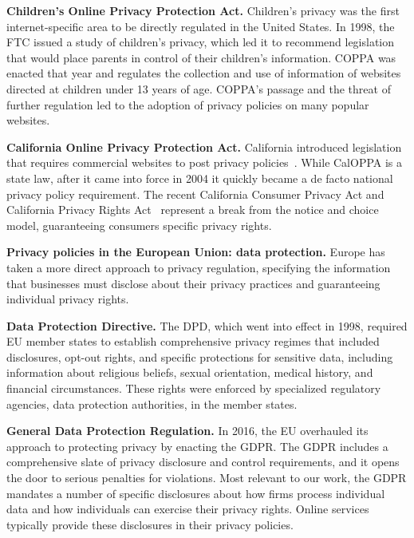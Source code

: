 {\textbf{Children's Online Privacy Protection Act.} Children's privacy was the first internet-specific area to be directly regulated in the United States. In 1998, the FTC issued a study of children's privacy, which led it to recommend legislation that would place parents in control of their children's information. COPPA was enacted that year and regulates the collection and use of information of websites directed at children under 13 years of age. COPPA’s passage and the threat of further regulation led to the adoption of privacy policies on many popular websites.

\textbf{California Online Privacy Protection Act.} California introduced legislation that requires commercial websites to post privacy policies~\cite{caloppa}. While CalOPPA is a state law, after it came into force in 2004 it quickly became a de facto national privacy policy requirement. The recent California Consumer Privacy Act and California Privacy Rights Act~\cite{ccpaANDcpra} represent a break from the notice and choice model, guaranteeing consumers specific privacy rights.

\textbf{Privacy policies in the European Union: data protection.}
Europe has taken a more direct approach to privacy regulation, specifying the information that businesses must disclose about their privacy practices and guaranteeing individual privacy rights.

\textbf{Data Protection Directive.} The DPD, which went into effect in 1998, required EU member states to establish comprehensive privacy regimes that included disclosures, opt-out rights, and specific protections for sensitive data, including information about religious beliefs, sexual orientation, medical history, and financial circumstances. These rights were enforced by specialized regulatory agencies, data protection authorities, in the member states.

\textbf{General Data Protection Regulation.} In 2016, the EU overhauled its approach to protecting privacy by enacting the GDPR. The GDPR includes a comprehensive slate of privacy disclosure and control requirements, and it opens the door to serious penalties for violations. Most relevant to our work, the GDPR mandates a number of specific disclosures about how firms process individual data and how individuals can exercise their privacy rights. Online services typically provide these disclosures in their privacy policies.

}